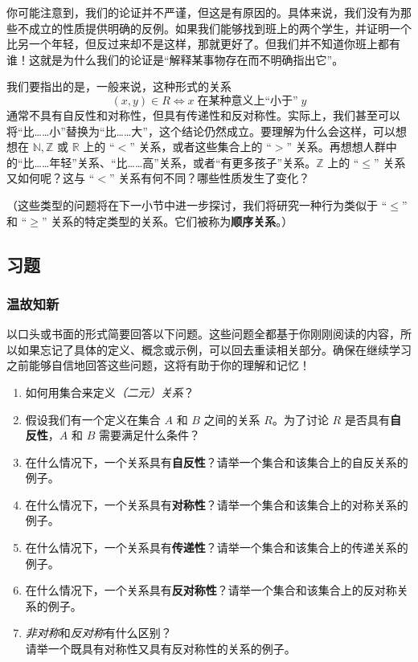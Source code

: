 你可能注意到，我们的论证并不严谨，但这是有原因的。具体来说，我们没有为那些不成立的性质提供明确的反例。如果我们能够找到班上的两个学生，并证明一个比另一个年轻，但反过来却不是这样，那就更好了。但我们并不知道你班上都有谁！这就是为什么我们的论证是``解释某事物存在而不明确指出它''。

我们要指出的是，一般来说，这种形式的关系
\[(x, y) \in R \iff x \;\text{在某种意义上``小于''}\; y\]
通常不具有自反性和对称性，但具有传递性和反对称性。实际上，我们甚至可以将``比……小''替换为``比……大''，这个结论仍然成立。要理解为什么会这样，可以想想在 $\mathbb{N}, \mathbb{Z}$ 或 $\mathbb{R}$ 上的 ``$<$'' 关系，或者这些集合上的 ``$>$'' 关系。再想想人群中的``比……年轻''关系、``比……高''关系，或者``有更多孩子''关系。$\mathbb{Z}$ 上的 ``$\le$'' 关系又如何呢？这与 ``$<$'' 关系有何不同？哪些性质发生了变化？

（这些类型的问题将在下一小节中进一步探讨，我们将研究一种行为类似于 ``$\le$'' 和 ``$\ge$'' 关系的特定类型的关系。它们被称为\textbf{顺序关系}。）

\subsection{习题}\label{sec:section6.2.5}

\subsubsection*{温故知新}

以口头或书面的形式简要回答以下问题。这些问题全都基于你刚刚阅读的内容，所以如果忘记了具体的定义、概念或示例，可以回去重读相关部分。确保在继续学习之前能够自信地回答这些问题，这将有助于你的理解和记忆！

\begin{enumerate}[label=(\arabic*)]
    \item 如何用集合来定义\emph{（二元）关系}？
    \item 假设我们有一个定义在集合 $A$ 和 $B$ 之间的关系 $R$。为了讨论 $R$ 是否具有\textbf{自反性}，$A$ 和 $B$ 需要满足什么条件？
    \item 在什么情况下，一个关系具有\textbf{自反性}？请举一个集合和该集合上的自反关系的例子。
    \item 在什么情况下，一个关系具有\textbf{对称性}？请举一个集合和该集合上的对称关系的例子。
    \item 在什么情况下，一个关系具有\textbf{传递性}？请举一个集合和该集合上的传递关系的例子。
    \item 在什么情况下，一个关系具有\textbf{反对称性}？请举一个集合和该集合上的反对称关系的例子。
    \item \emph{非对称}和\emph{反对称}有什么区别？\\
        请举一个既具有对称性又具有反对称性的关系的例子。
\end{enumerate}


